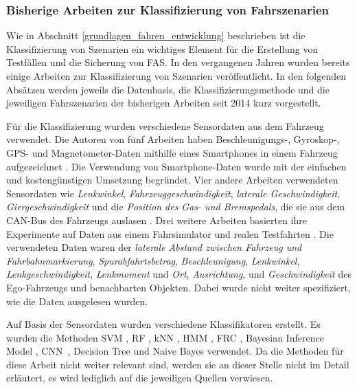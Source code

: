 \subsubsection{Bisherige Arbeiten zur Klassifizierung von Fahrszenarien}

Wie in Abschnitt \ref{grundlagen_fahren_entwicklung} beschrieben ist die Klassifizierung von Szenarien ein wichtiges Element für die Erstellung von Testfällen und die Sicherung von \ac{FAS}. In den vergangenen Jahren wurden bereits einige Arbeiten zur Klassifizierung von Szenarien veröffentlicht. In den folgenden Absätzen werden jeweils die Datenbasis, die Klassifizierungsmethode und die jeweiligen Fahrszenarien der bisherigen Arbeiten seit 2014 kurz vorgestellt.

Für die Klassifizierung wurden verschiedene Sensordaten aus dem Fahrzeug verwendet. Die Autoren von fünf Arbeiten haben Beschleunigungs-, Gyroskop-, GPS- und Magnetometer-Daten mithilfe eines Smartphones in einem Fahrzeug aufgezeichnet \cite{xie2018driving, cervantes2016vehicle, woo2016manoeuvre, camlica2016feature, arroyo2016adaptive}. Die Verwendung von Smartphone-Daten wurde mit der einfachen und kostengünstigen Umsetzung begründet. Vier andere Arbeiten verwendeten Sensordaten wie \textit{Lenkwinkel}, \textit{Fahrzeuggeschwindigkeit}, \textit{laterale Geschwindigkeit}, \textit{Giergeschwindigkeit} und die \textit{Position des Gas- und Bremspedals}, die sie aus dem CAN-Bus des Fahrzeugs auslasen \cite{zheng2017lane, zheng2015non, li2015lane, zheng2014threshold}. Drei weitere Arbeiten basierten ihre Experimente auf Daten aus einem Fahrsimulator \cite{sun2017robust, zheng2016drivers} und realen Testfahrten \cite{gruner2017spatiotemporal}. Die verwendeten Daten waren der \textit{laterale Abstand zwischen Fahrzeug und Fahrbahnmarkierung}, \textit{Spurabfahrtsbetrag}, \textit{Beschleunigung}, \textit{Lenkwinkel}, \textit{Lenkgeschwindigkeit}, \textit{Lenkmoment} und \textit{Ort}, \textit{Ausrichtung}, und \textit{Geschwindigkeit} des Ego-Fahrzeugs und benachbarten Objekten. Dabei wurde nicht weiter spezifiziert, wie die Daten ausgelesen wurden.

Auf Basis der Sensordaten wurden verschiedene Klassifikatoren erstellt. Es wurden die Methoden \ac{SVM} \cite{sun2017robust, cervantes2016vehicle, woo2016manoeuvre, camlica2016feature, zheng2016drivers, zheng2015non}, \ac{RF} \cite{xie2018driving, cervantes2016vehicle, zheng2016drivers}, \ac{kNN} \cite{zheng2017lane, camlica2016feature, zheng2016drivers}, \ac{HMM} \cite{zheng2017lane, li2015lane}, \ac{FRC} \cite{cervantes2016vehicle, arroyo2016adaptive}, Bayesian Inference Model \cite{sun2017robust}, \ac{CNN} \cite{gruner2017spatiotemporal}, Decision Tree \cite{zheng2014threshold} und Naive Bayes \cite{camlica2016feature} verwendet. Da die Methoden für diese Arbeit nicht weiter relevant sind, werden sie an dieser Stelle nicht im Detail erläutert, es wird lediglich auf die jeweiligen Quellen verwiesen.

